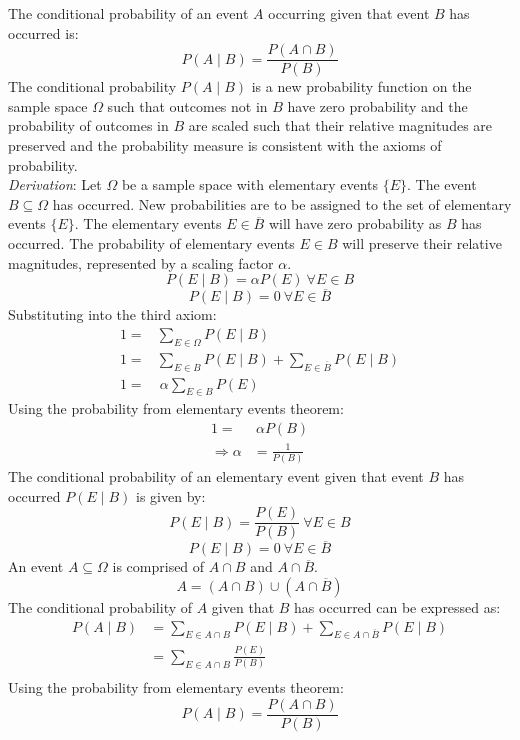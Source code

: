 \documentclass{article}
\begin{document}
The conditional probability of an event $A$ occurring given that event $B$ has occurred is:
\[P(A \mid B)=\frac{P(A \cap B)}{P(B)}\]
The conditional probability $P(A \mid B)$ is a new probability function on the sample space $\Omega$ such that outcomes not in $B$ have zero probability and the probability of outcomes in $B$ are scaled such that their relative magnitudes are preserved and the probability measure is consistent with the axioms of probability.\\
\textit{Derivation}: Let $\Omega$ be a sample space with elementary events $\{E\}$. The event $B \subseteq \Omega$ has occurred. New probabilities are to be assigned to the set of elementary events $\{E\}$. The elementary events $E \in \overline{B}$ will have zero probability as $B$ has occurred. The probability of elementary events $E \in B$ will preserve their relative magnitudes, represented by a scaling factor $\alpha$.
\[P(E \mid B) = \alpha P(E) \ \forall E \in B\]
\[P(E \mid B) = 0 \ \forall E \in \overline{B}\]
Substituting into the third axiom:
\begin{equation*}
\begin{split}
1 = & \sum_{E \in \Omega} P(E \mid B)\\
1 = & \sum_{E \in B} P(E \mid B) + \sum_{E \in \overline{B}} P(E \mid B)\\
1 = & \ \alpha \sum_{E \in B} P(E)
\end{split}
\end{equation*}
Using the probability from elementary events theorem:
\begin{equation*}
\begin{split}
1 = & \ \alpha P(B)\\
\Rightarrow \alpha & = \frac{1}{P(B)}
\end{split}
\end{equation*}
The conditional probability of an elementary event given that event $B$ has occurred $P(E \mid B)$ is given by:
\[P(E \mid B) = \frac{P(E)}{P(B)} \ \forall E \in B\]
\[P(E \mid B) = 0 \ \forall E \in \overline{B}\]
An event $A \subseteq \Omega$ is comprised of $A \cap B$ and $A \cap \overline{B}$.
\[A= (A \cap B) \cup (A \cap \overline{B})\]
The conditional probability of $A$ given that $B$ has occurred can be expressed as:
\begin{equation*}
\begin{split}
P(A \mid B) & = \sum_{E \in A \cap B} P(E \mid B) + \sum_{E \in A \cap \overline{B}} P(E \mid B)\\
& = \sum_{E \in A \cap B} \frac{P(E)}{P(B)}\\
\end{split}
\end{equation*}
Using the probability from elementary events theorem:
\[P(A \mid B) = \frac{P(A \cap B)}{P(B)}\]
\end{document}
